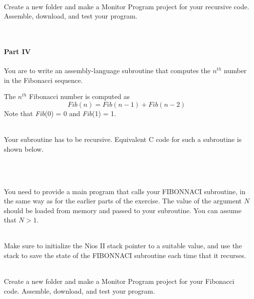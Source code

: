 \documentclass[epsfig,10pt,fullpage]{article}
\newcommand{\CommonDocsPath}{../../../../common/docs}
\begin{document}
~\\
\noindent
Create a new folder and make a Monitor Program project for your recursive code.
Assemble, download, and test your program.

~\\
~\\
\noindent
{\bf Part IV}
~\\
~\\
\noindent
You are to write an assembly-language subroutine that computes the $n^{th}$ number in 
the Fibonacci sequence.  

\noindent The $n^{th}$ Fibonacci number is computed as 
$$
Fib(n) = Fib(n - 1) + Fib(n - 2)
$$
\noindent
Note that {\it Fib}(0) = 0 and {\it Fib}(1) = 1.

~\\
\noindent
Your subroutine has to be recursive. Equivalent C code for such a subroutine is shown below. 

~\\
\begin{minipage}[H]{16.5 cm}

\end{minipage}

~\\
\noindent
You need to provide a main program that calls your FIBONNACI subroutine, in the same way as for
the earlier parts of the exercise. The value of the argument $N$ should be loaded from 
memory and passed to your subroutine.  You can assume that $N > 1$.

~\\
\noindent
Make sure to initialize the Nios II stack pointer to 
a suitable value, and use the stack to save the state of the FIBONNACI subroutine each 
time that it recurses.

~\\
\noindent
Create a new folder and make a Monitor Program project for your Fibonacci code.
Assemble, download, and test your program.



\end{document}
